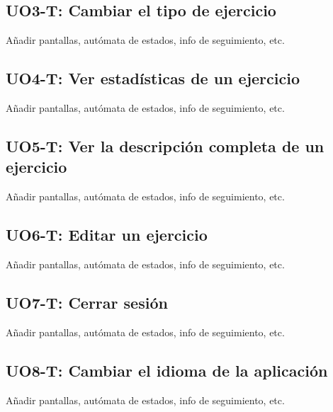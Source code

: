 \subsection{UO3-T: Cambiar el tipo de ejercicio}
\label{analisis-de-requisitos:funcionales:uo3t}

Añadir pantallas, autómata de estados, info de seguimiento, etc.\\

\subsection{UO4-T: Ver estadísticas de un ejercicio}
\label{analisis-de-requisitos:funcionales:uo4t}

Añadir pantallas, autómata de estados, info de seguimiento, etc.\\

\subsection{UO5-T: Ver la descripción completa de un ejercicio}
\label{analisis-de-requisitos:funcionales:uo5t}

Añadir pantallas, autómata de estados, info de seguimiento, etc.\\

\subsection{UO6-T: Editar un ejercicio}
\label{analisis-de-requisitos:funcionales:uo6t}

Añadir pantallas, autómata de estados, info de seguimiento, etc.\\

\subsection{UO7-T: Cerrar sesión}
\label{analisis-de-requisitos:funcionales:uo7t}

Añadir pantallas, autómata de estados, info de seguimiento, etc.\\

\subsection{UO8-T: Cambiar el idioma de la aplicación}
\label{analisis-de-requisitos:funcionales:uo8t}

Añadir pantallas, autómata de estados, info de seguimiento, etc.\\

